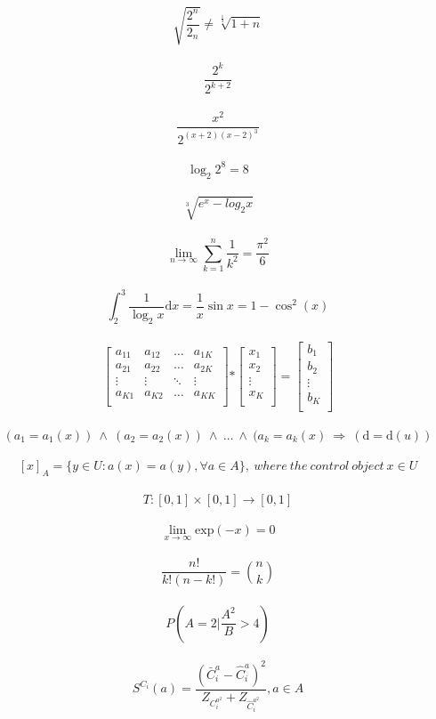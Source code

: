\documentclass[a4paper]{article}
\begin{document}
$$ \sqrt{ \frac{2^{n}}{2_n}} \neq \sqrt[\frac{1}{3}]{1+n} $$\\
$$ \frac{2^{k}}{2^{k+2}} $$\\
$$ \frac{x^{2}}{2^{(x+2)(x-2)^{3}}} $$\\
$$ \log_2{2^{8}} = 8 $$\\
$$ \sqrt[3]{e^{x} - log_2{x}} $$\\
$$ \lim_{n\rightarrow\infty}\sum_{k=1}^{n} \frac{1}{k^2} = \frac{\pi^{2}}{6} $$\\
$$ \int_{2}^{3} \frac{1}{\log_2{x}} \mathrm{d} x = \frac{1}{x} \sin{x} = 1 - \cos^{2}{(x)} $$\\
$$ 
\left[ \begin{array}{cccc}
a_{11} & a_{12} & \ldots & a_{1K} \\
a_{21} & a_{22} & \ldots & a_{2K} \\
\vdots & \vdots & \ddots & \vdots \\
a_{K1} & a_{K2} & \ldots & a_{KK} \\
\end{array} \right] 
\mathbf{*}
\left[ \begin{array}{c}
x_{1} \\
x_{2} \\
\vdots \\
x_{K} \\
\end{array} \right]
=
\left[ \begin{array}{c}
b_{1} \\
b_{2} \\
\vdots \\
b_{K} \\
\end{array} \right]
$$ \\
$$ (a_{1} = a_{1}(x)) \ \wedge \ (a_{2} = a_{2}(x)) \ \wedge \ \ldots \ \wedge \ (a_{k} = a_{k}(x) \ \Rightarrow \ (\mathrm{d} = \mathrm{d}(u)) $$\\
$$ [x]_{A} = \{y \in U:a(x)=a(y),\forall{a} \in A \}, \ where \ the \ control \ object \ x \in U $$\\
$$ T:[0,1] \times [0,1] \rightarrow [0,1] $$\\
$$ \lim_{x \rightarrow \infty} \mathrm{exp}(-x) = 0 $$\\
$$ \frac{n!}{k!(n-k!)} = {n \choose k} $$\\
$$ P\left(A=2 \Bigg| \frac{A^{2}}{B} > 4\right) $$\\
$$ S^{C_i}(a) = \frac{(\bar{C}_{i}^{a} - \hat{C}_{i}^{a})^{2}}{Z_{C_{i}^{a^{2}}} + Z_{\hat{C}_{i}^{a^{2}}}}, a \in A $$\\
\end{document}
